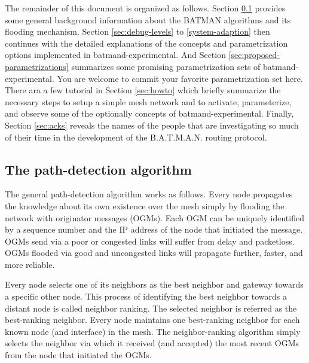 \documentclass[11pt]{article}
\begin{document}
The remainder of this document is organized as follows.
%
Section \ref{sec:algorithm} provides some general background information about the BATMAN algorithms and its flooding mechanism.
%
Section \ref{sec:debug-levels} to \ref{system-adaption} then continues with the detailed explanations of the concepts and parametrization options implemented in batmand-experimental.
%
And Section \ref{sec:proposed-parametrizations} summarizes some promising parametrization sets of batmand-experimental. You are welcome to commit your favorite parametrization set here.
%
There ara a few tutorial in Section \ref{sec:howto} which briefly summarize the necessary steps to setup a simple mesh network and to activate, parameterize, and observe some of the optionally concepts of batmand-experimental.
%
Finally, Section \ref{sec:acks} reveals the names of the people that are investigating so much of their time in the development of the B.A.T.M.A.N. routing protocol.




\subsection{The path-detection algorithm}
\label{sec:algorithm}
The general path-detection algorithm works as follows.
Every node propagates the knowledge about its own existence over the mesh simply by flooding the network with originator messages (OGMs).
%
Each OGM can be uniquely identified by a sequence number and the IP address of the node that initiated the message.
%
OGMs send via a poor or congested links will suffer from delay and packetloss.
OGMs flooded via good and uncongested links will propagate further, faster, and more reliable.


%
Every node selects one of its neighbors as the best neighbor and gateway towards a specific other node.
%
This process of identifying the best neighbor towards a distant node is called neighbor ranking.
%
The selected neighbor is referred as the best-ranking neighbor.
%
Every node maintains one best-ranking neighbor for each known node (and interface) in the mesh.
%
The neighbor-ranking algorithm simply selects the neighbor via which it received (and accepted) the most recent OGMs from the node that initiated the OGMs.
%
\end{document}
